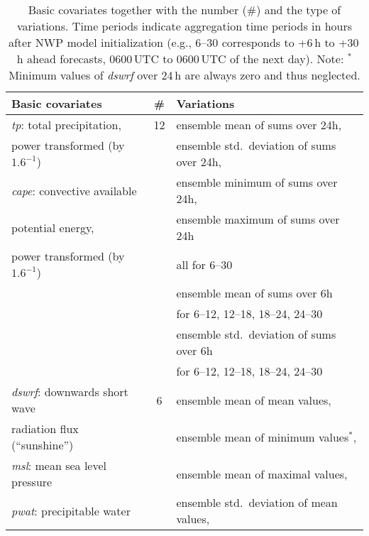 \documentclass[aoas, preprint]{imsart}
\numberwithin{equation}{subsection}
\begin{document}
\begin{table}[t!]
\begin{minipage}{\textwidth}
\caption[Table caption text]{Basic covariates together with the number ({\#}) 
and the type of variations.
Time periods indicate aggregation time periods in hours after NWP model
initialization (e.g., 6--30 corresponds to +6\,h to +30\,h ahead forecasts,
0600\,UTC to 0600\,UTC of the next day). Note: $^*$Minimum values of \emph{dswrf}
over 24\,h are always zero and thus neglected.}
\label{tab:covariates}
\begin{tabular}{ l  c  l }
\hline
Basic covariates & {\#} & Variations\\
\hline
\emph{tp}: total precipitation,           & 12  & ensemble mean of sums over 24h, \\
\hspace*{0.5cm} power transformed (by $1.6^{-1}$) &    & ensemble std.\ deviation of sums over 24h, \\ 
\emph{cape}: convective available     &    & ensemble minimum of sums over 24h, \\
\hspace*{0.9cm} potential energy, &    & ensemble maximum of sums over 24h\\
\hspace*{0.9cm} power transformed (by $1.6^{-1}$)&    & \qquad all for 6--30 \\
\hspace*{\fill}                            &    & ensemble mean of sums over 6h\\
\hspace*{\fill}                            &    & \qquad for 6--12, 12--18, 18--24, 24--30 \\
\hspace*{\fill}                            &    & ensemble std.\ deviation of sums over 6h\\
\hspace*{\fill}                            &    & \qquad for 6--12, 12--18, 18--24, 24--30 \\
\hline
\emph{dswrf}: downwards short wave      & 6 & ensemble mean of mean values, \\
\hspace*{1.13cm} radiation flux (``sunshine'') &   & ensemble mean of minimum values$^*$,\\
\emph{msl}: mean sea level pressure     &   &  ensemble mean of maximal values,\\
\emph{pwat}: precipitable water         &   & ensemble std.\ deviation of mean values,\\

\end{tabular}
\end{minipage}
\end{table}
\end{document}
